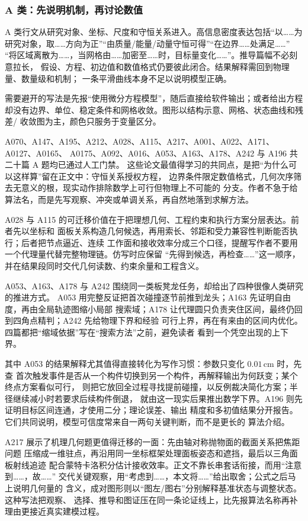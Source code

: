 \subsubsection{A 类：先说明机制，再讨论数值}

A 类行文从研究对象、坐标、尺度和守恒关系进入。高信息密度表达包括“以……为
研究对象，取……方向为正”“由质量/能量/动量守恒可得”“在边界……处满足……”
“将区域离散为……，当网格由……加密至……时，目标量变化……”。推导篇幅不必刻意拉长，
假设、方程、初边值和数值格式仍要彼此闭合。结果解释需回到物理量、数量级和机制；
一条平滑曲线本身不足以说明模型正确。

需要避开的写法是先报“使用微分方程模型”，随后直接给软件输出；或者给出方程
却没有边界、单位、稳定条件和网格收敛。图形以结构示意、网格、状态曲线和残差/
收敛图为主，颜色只服务于变量区分。

A070、A147、A195、A212、A028、A115、A217、A001、A022、A171、A0127、A0165、
A0175、A092、A016、A053、A163、A178、A242 与 A196 共二十篇 A 题均已通过人工门禁。
这些论文最值得学习的共同点，是把“为什么可以这样算”留在正文中：守恒关系授权方程，
边界条件限定数值格式，几何次序筛去无意义的根，现实动作排除数学上可行但物理上不可能的
分支。作者不急于给算法名，而是先写观察、冲突或单调关系，再自然地落到求解方法。

A028 与 A115 的可迁移价值在于把理想几何、工程约束和执行方案分层表达。前者先以坐标和
面板关系构造几何候选，再用索长、邻距和受力兼容性判断能否执行；后者把节点逼近、连续
工作面和接收效率分成三个口径，提醒写作者不要用一个代理量代替完整物理链。仿写时应保留
“先得到候选，再检查……”这一顺序，并在结果段同时交代几何读数、约束余量和工程含义。

A053、A163、A178 与 A242 围绕同一类板凳龙任务，却给出了四种很像人类研究的推进方式。
A053 用完整反证把首次碰撞逐节前推到龙头；A163 先证明自由度，再由全局轨迹图缩小局部
搜索域；A178 让代理圆只负责夹住区间，最终仍回到四角点精判；A242 先给物理下界和经验
可行上界，再在有来由的区间内优化。四篇都把“缩域依据”写在“搜索方法”之前，避免读者
看到一个凭空出现的上下界。

其中 A053 的结果解释尤其值得直接转化为写作习惯：参数只变化 $0.01\,\mathrm{cm}$ 时，先查
首次触发事件是否从一个构件切换到另一个构件，再解释输出为何跃变；某个终点方案看似可行，
则把它放回全过程寻找提前碰撞，以反例裁决简化方案；半径继续减小时若要求后续构件倒退，
就由这一现实后果推出数学下界。A196 则先证明目标区间连通，才使用二分；理论误差、输出
精度和多初值结果分开报告。它们共同说明，模型可信度常来自一两句关键判断，而不是更长的
算法介绍。

A217 展示了机理几何题更值得迁移的一面：先由轴对称抛物面的截面关系把焦距问题
压缩成一维驻点，再沿用同一坐标框架处理面板姿态和遮挡，最后以三角面板射线追迹
配合蒙特卡洛积分估计接收效率。正文不靠长串套话衔接，而用“注意到……，故……”
交代关键观察，用“考虑到……，本文将……”给出取舍；公式之后马上说明几何量的
含义，成对图形则以“图左/图右”分别解释基准状态与调整状态。这种写法把观察、
选择、推导和图证压在同一条论证线上，比先报算法名称再补理由更接近真实建模过程。

